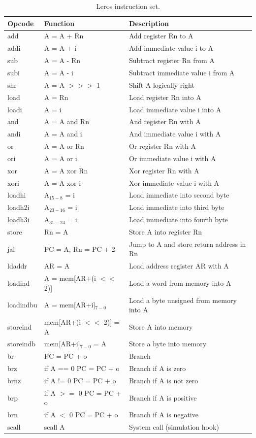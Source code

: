 \documentclass[%
    10pt,
    headinclude, footexclude,
    openright, %
    notitlepage,
    cleardoubleempty,
    headsepline,
    pointlessnumbers,
    bibtotoc, idxtotoc,
    ]{scrbook}
\begin{document}
{\begin{table}
\centering
\begin{tabular}{lll}
\toprule
Opcode & Function & Description\\
\midrule
add & A = A + Rn & Add register Rn to A \\
addi & A = A + i & Add immediate value i to A \\
sub & A = A - Rn & Subtract register Rn from A \\
subi & A = A - i & Subtract immediate value i from A \\
shr & A = A $>>>$ 1 & Shift A logically right \\
load & A = Rn & Load register Rn into A \\
loadi & A = i & Load immediate value i into A \\
and & A = A and Rn & And register Rn with A \\
andi & A = A and i & And immediate value i with A \\
or & A = A or Rn & Or register Rn with A \\
ori & A = A or i & Or immediate value i with A \\
xor & A = A xor Rn & Xor register Rn with A \\
xori & A = A xor i & Xor immediate value i with A \\
loadhi & A$_{15-8}$ = i & Load immediate into second byte \\
loadh2i & A$_{23-16}$ = i  & Load immediate into third byte \\
loadh3i & A$_{31-24}$ = i & Load immediate into fourth byte \\
store & Rn = A & Store A into register Rn \\
jal & PC = A, Rn = PC + 2 & Jump to A and store return address in Rn \\
ldaddr & AR = A & Load address register AR with A \\
loadind & A = mem[AR+(i $<<$ 2)] & Load a word from memory into A \\
loadindbu & A = mem[AR+i]$_{7-0}$  &  Load a byte unsigned from memory into A\\
storeind & mem[AR+(i $<<$ 2)] = A & Store A into memory \\
storeindb & mem[AR+i]$_{7-0}$ = A & Store a byte into memory \\
br & PC = PC + o & Branch \\
brz & if A == 0 PC = PC + o & Branch if A is zero \\
brnz & if A != 0 PC = PC + o  & Branch if A is not zero \\
brp & if A $>=$ 0 PC = PC + o & Branch if A is positive \\
brn & if A $<$ 0 PC = PC + o & Branch if A is negative \\
scall & scall A & System call (simulation hook) \\
\bottomrule
\end{tabular}
\caption{Leros instruction set.}
\label{tab:leros:isa}
\end{table}

}
\end{document}
